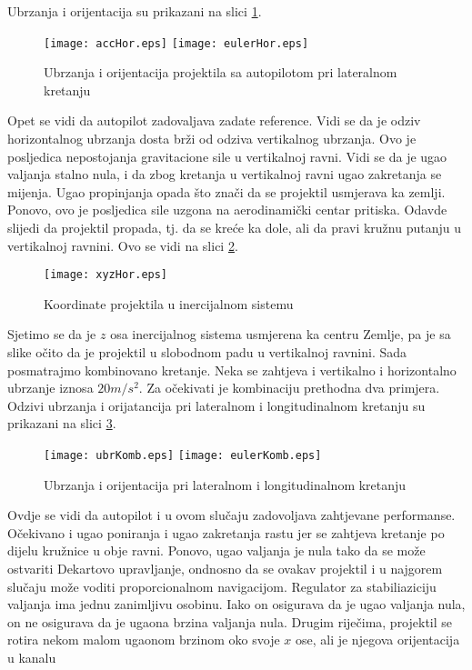 Ubrzanja i orijentacija su prikazani na slici \ref{fig:horOdziv}.
\begin{figure}[!ht]
    \centering
    \texttt{[image: accHor.eps]}
    \texttt{[image: eulerHor.eps]}
    \caption{Ubrzanja i orijentacija projektila sa autopilotom pri lateralnom kretanju}
    \label{fig:horOdziv}
\end{figure}
Opet se vidi da autopilot zadovaljava zadate reference. Vidi se da je odziv horizontalnog 
ubrzanja dosta brži od odziva vertikalnog ubrzanja. Ovo je posljedica nepostojanja 
gravitacione sile u vertikalnoj ravni. Vidi se da je ugao valjanja stalno nula, i da zbog 
kretanja u vertikalnoj ravni ugao zakretanja se mijenja. Ugao propinjanja opada što 
znači da se projektil usmjerava ka zemlji. Ponovo, ovo je posljedica sile uzgona na 
aerodinamički centar pritiska. Odavde slijedi da projektil propada, tj. da se kreće ka dole, ali da pravi 
kružnu putanju u vertikalnoj ravnini. Ovo se vidi na slici \ref{fig:horxyz}.
\begin{figure}[!ht]
    \centering 
    \texttt{[image: xyzHor.eps]}
    \caption{Koordinate projektila u inercijalnom sistemu }
    \label{fig:horxyz}
\end{figure}
Sjetimo se da je $z$ osa inercijalnog sistema usmjerena ka centru Zemlje, pa je sa slike očito da 
je projektil u slobodnom padu u vertikalnoj ravnini. 
Sada posmatrajmo kombinovano kretanje. Neka se zahtjeva i vertikalno i horizontalno 
ubrzanje iznosa $20m/s^2$. Za očekivati je kombinaciju prethodna dva primjera. 
Odzivi ubrzanja i orijatancija pri lateralnom i longitudinalnom kretanju su prikazani na slici \ref{fig:kombinovano}.
\begin{figure}[!ht]
    \centering
    \texttt{[image: ubrKomb.eps]}
    \texttt{[image: eulerKomb.eps]}
    \caption{Ubrzanja i orijentacija pri lateralnom i longitudinalnom kretanju}
    \label{fig:kombinovano}
\end{figure}
Ovdje se vidi da autopilot i u ovom slučaju zadovoljava zahtjevane performanse. Očekivano i 
ugao poniranja i ugao zakretanja rastu jer se zahtjeva kretanje po dijelu kružnice u obje ravni. 
Ponovo, ugao valjanja je nula tako da se može ostvariti Dekartovo upravljanje, ondnosno da 
se ovakav projektil i u najgorem slučaju može voditi proporcionalnom navigacijom.
Regulator za stabiliaziciju valjanja ima jednu zanimljivu osobinu. Iako on osigurava 
da je ugao valjanja nula, on ne osigurava da je ugaona brzina valjanja nula. Drugim riječima, 
projektil se rotira nekom malom ugaonom brzinom oko svoje $x$ ose, ali je njegova orijentacija u kanalu 
